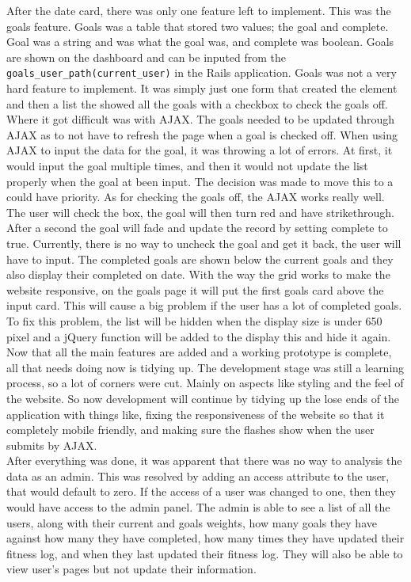 After the date card, there was only one feature left to implement. This was the goals feature. Goals was a table that stored two values; the goal and complete. Goal was a string and was what the goal was, and complete was boolean. Goals are shown on the dashboard and can be inputed from the \lstinline{goals_user_path(current_user)} in the Rails application. Goals was not a very hard feature to implement. It was simply just one form that created the element and then a list the showed all the goals with a checkbox to check the goals off. Where it got difficult was with AJAX. The goals needed to be updated through AJAX as to not have to refresh the page when a goal is checked off. When using AJAX to input the data for the goal, it was throwing a lot of errors. At first, it would input the goal multiple times, and then it would not update the list properly when the goal at been input. The decision was made to move this to a could have priority. As for checking the goals off, the AJAX works really well. The user will check the box, the goal will then turn red and have strikethrough. After a second the goal will fade and update the record by setting complete to true. Currently, there is no way to uncheck the goal and get it back, the user will have to input. The completed goals are shown below the current goals and they also display their completed on date. With the way the grid works to make the website responsive, on the goals page it will put the first goals card above the input card. This will cause a big problem if the user has a lot of completed goals. To fix this problem, the list will be hidden when the display size is under 650 pixel and a jQuery function will be added to the display this and hide it again.\\

Now that all the main features are added and a working prototype is complete, all that needs doing now is tidying up. The development stage was still a learning process, so a lot of corners were cut. Mainly on aspects like styling and the feel of the website. So now development will continue by tidying up the lose ends of the application with things like, fixing the responsiveness of the website so that it completely mobile friendly, and making sure the flashes show when the user submits by AJAX.\\

After everything was done, it was apparent that there was no way to analysis the data as an admin. This was resolved by adding an access attribute to the user, that would default to zero. If the access of a user was changed to one, then they would have access to the admin panel. The admin is able to see a list of all the users, along with their current and goals weights, how many goals they have against how many they have completed, how many times they have updated their fitness log, and when they last updated their fitness log. They will also be able to view user's pages but not update their information. \\

